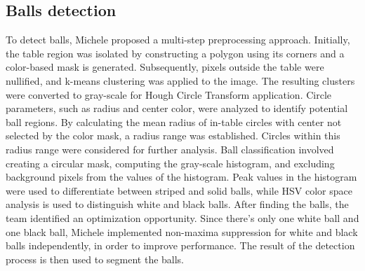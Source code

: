\subsection{Balls detection}

To detect balls, Michele proposed a multi-step preprocessing approach. Initially, the table region was isolated by constructing a polygon using its corners and a color-based mask is generated. Subsequently, pixels outside the table were nullified, and k-means clustering was applied to the image. The resulting clusters were converted to gray-scale for Hough Circle Transform application.
Circle parameters, such as radius and center color, were analyzed to identify potential ball regions. By calculating the mean radius of in-table circles with center not selected by the color mask, a radius range was established. Circles within this radius range were considered for further analysis. Ball classification involved creating a circular mask, computing the gray-scale histogram, and excluding background pixels from the values of the histogram. Peak values in the histogram were used to differentiate between striped and solid balls, while HSV color space analysis is used to distinguish white and black balls. 
After finding the balls, the team identified an optimization opportunity. Since there's only one white ball and one black ball, Michele implemented non-maxima suppression for white and black balls independently, in order to improve performance.
The result of the detection process is then used to segment the balls.
